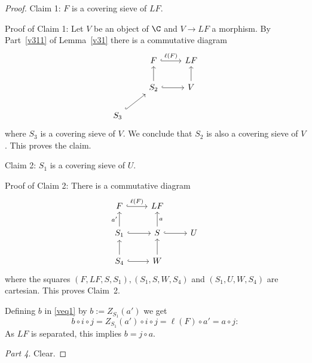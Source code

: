 \documentclass[12pt]{article}
\theoremstyle{remark}
\theoremstyle{definition}
\begin{document}
\begin{proof}
\noindent Claim 1: $F$ is a covering sieve of $LF$. 

\noindent Proof of Claim 1: Let $V$ be an object of $\C$ and $V\to LF$ a morphism. By Part~\ref{v311} of Lemma~\ref{v31} there is a commutative diagram 
$$
\begin{tikzcd}
&F\ar[r,hookrightarrow,"\ell(F)"]&LF\\ 
&S_2\ar[u]\ar[r,hookrightarrow]&V\ar[u]\\ 
S_3\ar[ur,hookrightarrow]
\end{tikzcd}
$$ 
where $S_3$ is a covering sieve of $V$. We conclude that $S_2$ is also a covering sieve of $V$. This proves the claim. 

\noindent Claim 2: $S_1$ is a covering sieve of $U$.

\noindent Proof of Claim 2: There is a commutative diagram 
$$
\begin{tikzcd}
F\ar[r,hookrightarrow,"\ell(F)"]&LF\\ 
S_1\ar[u,"a'"]\ar[r,hookrightarrow]&S\ar[u,"a"']\ar[r,hookrightarrow]&U\\ 
S_4\ar[u]\ar[r,hookrightarrow]&W\ar[u]
\end{tikzcd}
$$ 
where the squares $(F,LF,S,S_1),(S_1,S,W,S_4)$ and $(S_1,U,W,S_4)$ are cartesian. This proves Claim~2.

Defining $b$ in \eqref{veq1} by $b:=Z_{S_1}(a')$ we get 
$$
b\circ i\circ j=Z_{S_1}(a')\circ i\circ j=\ell(F)\circ a'=a\circ j:
$$ 
As $LF$ is separated, this implies $b=j\circ a$. %

\noindent\emph{Part 4}. Clear.%
\end{proof}
\end{document}
